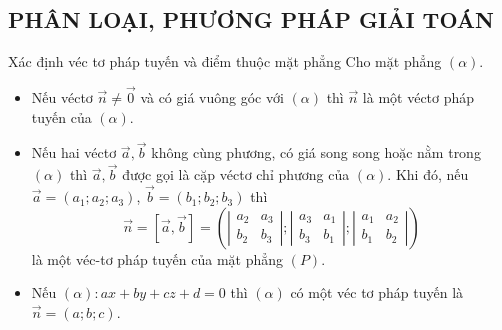 \subsection{PHÂN LOẠI, PHƯƠNG PHÁP GIẢI TOÁN}
\begin{dang}{Xác định véc tơ pháp tuyến và điểm thuộc mặt phẳng}
	Cho mặt phẳng $(\alpha)$.
	\begin{itemize}
		\item  [\ding{172}] Nếu véctơ $\overrightarrow{n} \ne \overrightarrow{0}$ và có giá vuông góc với $(\alpha)$ thì $\overrightarrow{n}$ là một véctơ pháp tuyến của $(\alpha)$.
		\item  [\ding{173}] Nếu hai véctơ $\overrightarrow{a}, \overrightarrow{b}$ không cùng phương, có giá song song hoặc nằm trong $(\alpha)$ thì $\overrightarrow{a}, \overrightarrow{b}$ được gọi là cặp véctơ chỉ phương của $(\alpha)$. Khi đó, nếu $\vec{a}=(a_1;a_2;a_3)$, $\vec{b}=(b_1;b_2;b_3)$ thì
		$$\vec{n}= [\vec{a}, \vec{b}]=\left(\left|\begin{array}{ll}a_2 & a_3 \\ b_2 & b_3\end{array}\right| ;\left|\begin{array}{ll}a_3 & a_1 \\ b_3 & b_1\end{array}\right| ;\left|\begin{array}{ll}a_1 & a_2 \\ b_1 & b_2\end{array}\right|\right)$$ là một véc-tơ pháp tuyến của mặt phẳng $(P)$.
		\item [\ding{174}] Nếu $(\alpha) \colon ax + by + cz + d = 0$ thì $(\alpha)$ có một véc tơ pháp tuyến là $\vec{n}=(a;b;c)$.
	\end{itemize}
\end{dang}

